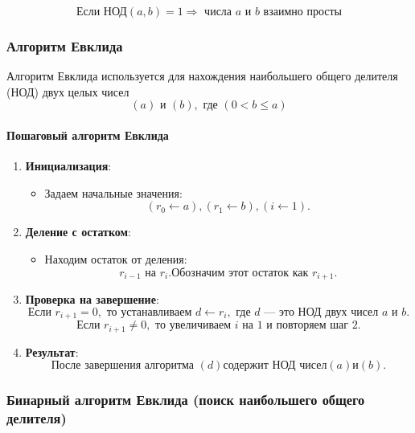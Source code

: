 \documentclass[
]{article}
\providecommand{\tightlist}{%
  \setlength{\itemsep}{0pt}\setlength{\parskip}{0pt}}
\begin{document}
\[
\text{Если НОД}(a, b) = 1 \Rightarrow \text{ числа } a \text{ и } b \text{ взаимно просты}
\]

\subsubsection{Алгоритм
Евклида}\label{ux430ux43bux433ux43eux440ux438ux442ux43c-ux435ux432ux43aux43bux438ux434ux430}

Алгоритм Евклида используется для нахождения наибольшего общего делителя
(НОД) двух целых чисел \[
( a ) \text{ и } ( b ), \text{ где } ( 0 < b \leq a )
\]

\paragraph{Пошаговый алгоритм
Евклида}\label{ux43fux43eux448ux430ux433ux43eux432ux44bux439-ux430ux43bux433ux43eux440ux438ux442ux43c-ux435ux432ux43aux43bux438ux434ux430}

\begin{enumerate}
\def\labelenumi{\arabic{enumi}.}
\item
  \textbf{Инициализация}:

  \begin{itemize}
  \tightlist
  \item
    Задаем начальные значения: \[
    ( r_0 \leftarrow a ), ( r_1 \leftarrow b ), ( i \leftarrow 1 ).
    \]
  \end{itemize}
\item
  \textbf{Деление с остатком}:

  \begin{itemize}
  \tightlist
  \item
    Находим остаток от деления: \[
     r_{i-1}  \text{ на }  r_i . \text{Обозначим этот остаток как }  r_{i+1} .
    \]
  \end{itemize}
\item
  \textbf{Проверка на завершение}: \[
  \text{Если } r_{i+1} = 0, \text{ то устанавливаем } d \gets r_i, \text{ где } d \text{ — это НОД двух чисел } a \text{ и } b.
  \] \[
  \text{Если } r_{i+1} \neq 0, \text{ то увеличиваем } i \text{ на 1 и повторяем шаг 2.}
  \]
\item
  \textbf{Результат}: \[
  \text{После завершения алгоритма } ( d ) \text{содержит НОД чисел} ( a ) \text{и} ( b ).
  \]
\end{enumerate}

\subsubsection{Бинарный алгоритм Евклида (поиск наибольшего общего
делителя)}\label{ux431ux438ux43dux430ux440ux43dux44bux439-ux430ux43bux433ux43eux440ux438ux442ux43c-ux435ux432ux43aux43bux438ux434ux430-ux43fux43eux438ux441ux43a-ux43dux430ux438ux431ux43eux43bux44cux448ux435ux433ux43e-ux43eux431ux449ux435ux433ux43e-ux434ux435ux43bux438ux442ux435ux43bux44f}
\end{document}
